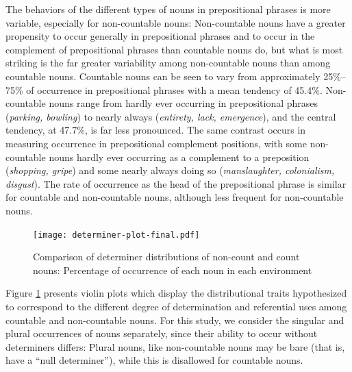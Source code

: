 \documentclass[output=paper]{langscibook}
\begin{document}
\begin{sloppypar}
The behaviors of the different types of nouns in prepositional phrases is more variable, especially for non-countable nouns: Non-countable nouns have a greater propensity to occur generally in prepositional phrases and to occur in the complement of  prepositional phrases than countable nouns do, but what is most striking is the far greater variability among non-countable nouns than among countable nouns.  Countable nouns can be seen to vary from approximately 25\%--75\% of occurrence in prepositional phrases with a mean tendency of  45.4\%.  Non-countable nouns range from hardly ever occurring in prepositional phrases (\textit{parking, bowling}) to nearly always (\textit{entirety, lack, emergence}), and the central tendency, at 47.7\%, is far less pronounced. %
The same contrast occurs in measuring occurrence in prepositional complement positions, with some non-countable nouns  hardly ever occurring as a complement to a preposition (\textit{shopping, gripe}) and some nearly always doing so (\textit{manslaughter, colonialism, disgust}). The rate of occurrence as the head of the prepositional phrase is similar for countable and non-countable nouns, although less frequent for non-countable nouns.
\end{sloppypar}



\begin{figure}
    \centering
    \texttt{[image: determiner-plot-final.pdf]}
    \caption{Comparison of determiner distributions of non-count and count nouns: Percentage of occurrence of each noun in  each environment}
    \label{gri-ric:fig:referentialWeight}
\end{figure}




Figure \ref{gri-ric:fig:referentialWeight} presents violin plots which display the distributional traits hypothesized to correspond to the different degree of determination and referential uses among countable and non-countable nouns. For this study,  we consider the singular and plural occurrences of nouns separately, since their ability to occur without determiners differs: Plural nouns, like non-countable nouns may be bare (that is, have a ``null determiner''), while this is disallowed for countable nouns.\largerpage
\end{document}
